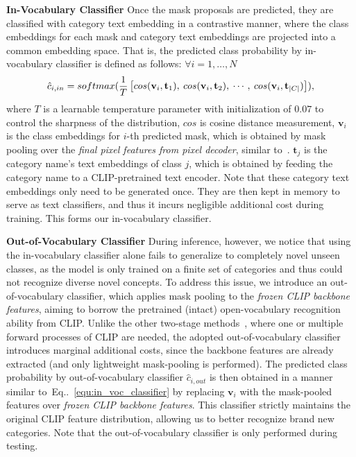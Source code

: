 \documentclass{article}
\makeatletter
\DeclareRobustCommand\onedot{\futurelet\@let@token\@onedot}
\def\@onedot{\ifx\@let@token.\else.\null\fi\xspace}
\newcommand{\equref}[1]{Eq\onedot~\eqref{#1}}
\makeatother
\begin{document}
\noindent \textbf{In-Vocabulary Classifier}\quad
Once the mask proposals are predicted, they are classified with category text embedding in a contrastive manner, where the class embeddings for each mask and category text embeddings are projected into a common embedding space. That is, the predicted class probability by in-vocabulary classifier is defined as follows: $\forall i=1, \dots, N$ 
\begin{equation}
\label{equ:in_voc_classifier}
\hat{c}_{i, in} = softmax(\frac{1}{T}
    \begingroup
    \setlength\arraycolsep{2pt}
    \begin{bmatrix}
    cos(\mathbf{v}_i, \mathbf{t}_1), & 
    cos(\mathbf{v}_i, \mathbf{t}_2), &
    \cdots, & 
    cos(\mathbf{v}_i, \mathbf{t}_{|C|})
    \end{bmatrix}),
    \endgroup    
\end{equation}
where $T$ is a learnable temperature parameter with initialization of $0.07$ to control the sharpness of the distribution, $cos$ is cosine distance measurement, $\mathbf{v}_i$ is the class embeddings for $i$-th predicted mask, which is obtained by mask pooling over the \textit{final pixel features from pixel decoder}, similar to~\cite{ghiasi2022scaling}.
$\mathbf{t}_j$ is the category name's text embeddings of class $j$, which is obtained by feeding the category name to a CLIP-pretrained text encoder.
Note that these category text embeddings only need to be generated once.
They are then kept in memory to serve as text classifiers, and thus it incurs negligible additional cost during training. This forms our in-vocabulary classifier.

\noindent \textbf{Out-of-Vocabulary Classifier}\quad
During inference, however, we notice that using the in-vocabulary classifier alone fails to generalize to completely novel unseen classes, as the model is only trained on a finite set of categories and thus could not recognize diverse novel concepts.
To address this issue, we introduce an out-of-vocabulary classifier, which applies mask pooling to the \textit{frozen CLIP backbone features}, aiming to borrow the pretrained (intact) open-vocabulary recognition ability from CLIP.
Unlike the other two-stage methods~\cite{xu2021simple,liang2022open,ding2022open,xu2023open}, where one or multiple forward processes of CLIP are needed, the adopted out-of-vocabulary classifier introduces marginal additional costs, since the backbone features are already extracted (and only lightweight mask-pooling is performed).
The predicted class probability by out-of-vocabulary classifier $\hat{c}_{i, out}$ is then obtained in a manner similar to~\equref{equ:in_voc_classifier} by replacing $\mathbf{v}_i$ with the mask-pooled features over \textit{frozen CLIP backbone features}.
This classifier strictly maintains the original CLIP feature distribution, allowing us to better recognize brand new categories.
Note that the out-of-vocabulary classifier is only performed during testing.
\end{document}
